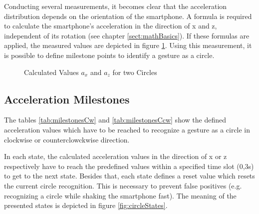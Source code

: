 Conducting several measurements, it becomes clear that the acceleration
distribution depends on the orientation of the smartphone. A formula is required
to calculate the smartphone's acceleration in the direction of x and z,
independent of its rotation (see chapter \ref{sect:mathBasics}). If these
formulas are applied, the measured values are depicted in figure
\ref{fig:finalAcc}. Using this measurement, it is possible to define milestone
points to identify a gesture as a circle.
 
\begin{figure}
\centering
\captionsetup{justification=centering}
\caption{Calculated Values $a_x$ and $a_z$ for two Circles}
\label{fig:finalAcc}
\end{figure}

\subsection{Acceleration Milestones}
\label{sec:accmilestones}

The tables \ref{tab:milestonesCw} and \ref{tab:milestonesCcw} show the
defined acceleration values which have to be reached to recognize a gesture as a
circle in clockwise or counterclowckwise direction.

In each state, the calculated acceleration values in the direction of x or z
respectively have to reach the predefined values within a specified time slot
(0,3s) to get to the next state. Besides that, each state defines a reset value
which resets the current circle recognition. This is necessary to prevent false
positives (e.g. recognizing a circle while shaking the smartphone fast). The
meaning of the presented states is depicted in figure \ref{fig:circleStates}.


